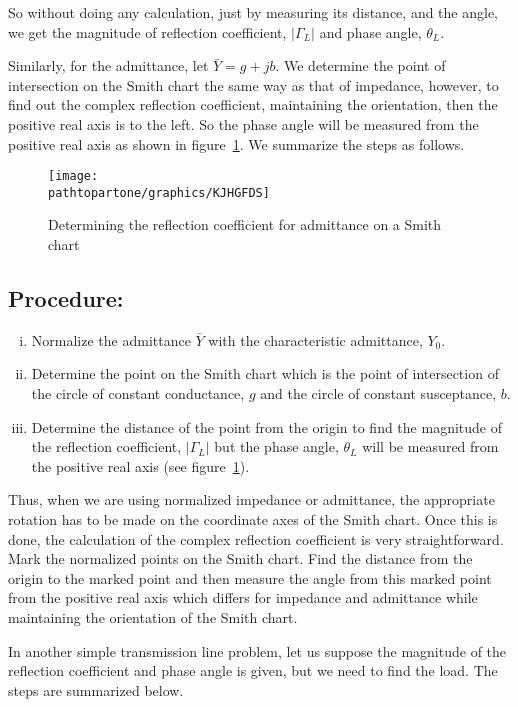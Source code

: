 So without doing any calculation, just by measuring its distance, and the angle, we get the magnitude of reflection coefficient, $|\Gamma_L|$
and phase angle, $\theta_L$. 

Similarly, for the admittance, let $\bar{Y} = g + jb$. We determine the point of intersection on the Smith chart the same way as that of impedance, however, to find out the complex reflection coefficient, maintaining the orientation, then the positive real axis is to the left. So the phase angle will be measured from the positive real axis as shown in figure~\ref{fig:kjhgfds}. We summarize the steps as follows.
\begin{figure}[h]
\centering
\texttt{[image: \\pathtopartone/graphics/KJHGFDS]}
\caption{Determining the reflection coefficient for admittance on a Smith chart}
\label{fig:kjhgfds}
\end{figure}

\subsection*{Procedure:}
\begin{enumerate}[(i)]
\item Normalize the admittance $\bar{Y}$ with the characteristic admittance, $Y_0$.
\item Determine the point on the Smith chart which is the point of intersection of the circle of constant conductance, $g$ and the circle of constant susceptance, $b$.
\item Determine the distance of the point from the origin to find the magnitude of the reflection coefficient, $|\Gamma_L|$ but the phase angle, $\theta_L$ will be measured from the positive real axis (see figure~\ref{fig:kjhgfds}). 
\end{enumerate}

Thus, when we are using normalized impedance or admittance, the appropriate rotation has to be made on the coordinate axes of the Smith chart. Once this is done, the calculation of the complex reflection coefficient is very straightforward. Mark the normalized points on the Smith chart. Find the distance from the origin to the marked point and then measure the angle from this marked point from the positive real axis which differs for impedance and admittance while maintaining the orientation of the Smith chart. 

In another simple transmission line problem, let us suppose the magnitude of the reflection coefficient and phase angle is given, but we need to find the load. The steps are summarized below.
